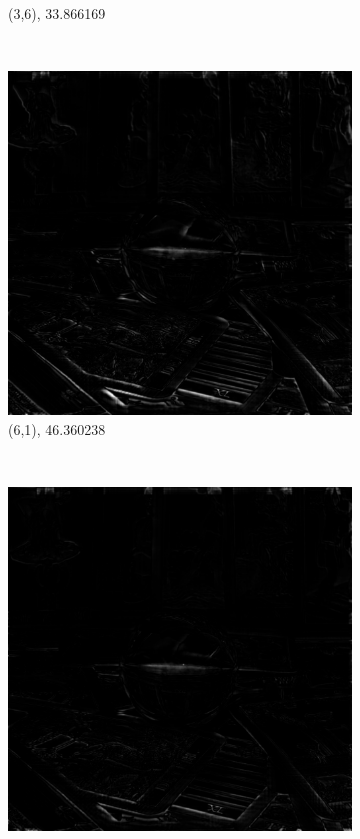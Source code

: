 \documentclass[11pt,a4paper,titlepage]{article}
\begin{document}
\begin{figure}
\begin{subfigure}[t]{0.3\textwidth}
		\caption{(3,6), 33.866169}
	\end{subfigure}%
	\\
	\begin{subfigure}[t]{0.3\textwidth}
		\includegraphics[width=\textwidth]{results/tile_blending/tarot6x6x512x512-512x512x5-sampling=2x_tileRes=200x200_overlap=0.5/MSE_for_view_(6,1).png} 
		\caption{(6,1), 46.360238}
	\end{subfigure}%
	~
	\begin{subfigure}[t]{0.3\textwidth}
		\includegraphics[width=\textwidth]{results/tile_blending/tarot6x6x512x512-512x512x5-sampling=2x_tileRes=200x200_overlap=0.5/MSE_for_view_(6,3).png} 

\end{subfigure}
\end{figure}
\end{document}
